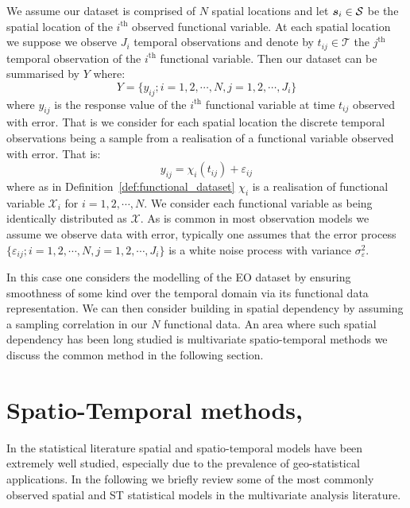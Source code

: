 We assume our dataset is comprised of $N$ spatial locations and let $\boldsymbol{{s}}_i \in \mathcal{S}$ be the spatial location of the $i^\text{th}$ observed functional variable. At each spatial location we suppose we observe $J_i$ temporal observations and denote by $t_{ij} \in \mathcal{T}$ the $j^\text{th}$ temporal observation of the $i^\text{th}$ functional variable. Then our dataset can be summarised by $Y$ where:
\begin{equation}
	Y = \{ y_{ij}; i=1,2,\cdots,N, j=1,2, \cdots, J_i \}
	\label{eqn:observed_data}
\end{equation}
where $y_{ij}$ is the response value of the $i^\text{th}$ functional variable at time $t_{ij}$ observed with error. That is we consider for each spatial location the discrete temporal observations being a sample from a realisation of a functional variable observed with error. That is:
\begin{equation}
	y_{ij} = \chi_{i}\left( t_{ij} \right) + \varepsilon_{ij}
	\label{eqn:fd_temporal}
\end{equation}
where as in Definition~\ref{def:functional_dataset} $\chi_i$ is a realisation of functional variable $\mathcal{X}_i$ for $i=1,2,\cdots,N$. We consider each functional variable as being identically distributed as $\mathcal{X}$. As is common in most observation models we assume we observe data with error, typically one assumes that the error process $\{\varepsilon_{ij}; i=1,2,\cdots,N, j=1,2,\cdots,J_i\}$ is a white noise process with variance $\sigma_\varepsilon^2$. 

In this case one considers the modelling of the EO dataset by ensuring smoothness of some kind over the temporal domain via its functional data representation. We can then consider building in spatial dependency by assuming a sampling correlation in our $N$ functional data. An area where such spatial dependency has been long studied is multivariate spatio-temporal methods we discuss the common method in the following section. 

\section{Spatio-Temporal methods, \label{sec:st_methods}}
In the statistical literature spatial and spatio-temporal models have been extremely well studied, especially due to the prevalence of geo-statistical applications. In the following we briefly review some of the most commonly observed spatial and ST statistical models in the multivariate analysis literature. 

